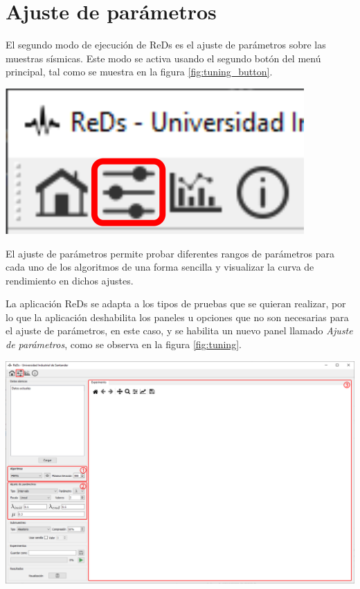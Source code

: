\documentclass[12pt,twoside,letter]{ol-softwaremanual}
\newenvironment{Figure}
  {\par\medskip\noindent\minipage{\linewidth}}
  {\endminipage\par\medskip}
\begin{document}
\vspace{0.5cm}
\section{Ajuste de parámetros}

\begin{multicols}{2}

El segundo modo de ejecución de ReDs es el ajuste de parámetros sobre las muestras sísmicas. Este modo se activa usando el segundo botón del menú principal, tal como se muestra en la figura \ref{fig:tuning_button}.

\begin{Figure}
    \centering
    \includegraphics[width=0.4\linewidth]{tuning-tab.png}
    \label{fig:tuning_button}
\end{Figure}

\end{multicols}

El ajuste de parámetros permite probar diferentes rangos de parámetros para cada uno de los algoritmos de una forma sencilla y visualizar la curva de rendimiento en dichos ajustes.

La aplicación ReDs se adapta a los tipos de pruebas que se quieran realizar, por lo que la aplicación deshabilita los paneles u opciones que no son necesarias para el ajuste de parámetros, en este caso, y se habilita un nuevo panel llamado \emph{Ajuste de parámetros}, como se observa en la figura \ref{fig:tuning}.

\begin{Figure}
    \centering
    \includegraphics[width=1\linewidth]{tuning.png}
    \label{fig:tuning}
\end{Figure}
\end{document}
